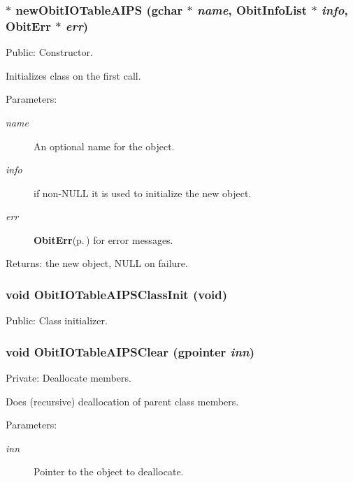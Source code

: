 \subsubsection{$\ast$ new\-Obit\-IOTable\-AIPS (gchar $\ast$ {\em name}, {\bf Obit\-Info\-List} $\ast$ {\em info}, {\bf Obit\-Err} $\ast$ {\em err})}\label{ObitIOTableAIPS_8c_a9}


Public: Constructor. 

Initializes class on the first call. \begin{Desc}
\item[Parameters:]
\begin{description}
\item[{\em name}]An optional name for the object. \item[{\em info}]if non-NULL it is used to initialize the new object. \item[{\em err}]{\bf Obit\-Err}{\rm (p.\,\pageref{structObitErr})} for error messages. \end{description}
\end{Desc}
\begin{Desc}
\item[Returns:]the new object, NULL on failure. \end{Desc}
\subsubsection{\setlength{\rightskip}{0pt plus 5cm}void Obit\-IOTable\-AIPSClass\-Init (void)}\label{ObitIOTableAIPS_8c_a28}


Public: Class initializer. 

\subsubsection{\setlength{\rightskip}{0pt plus 5cm}void Obit\-IOTable\-AIPSClear (gpointer {\em inn})}\label{ObitIOTableAIPS_8c_a5}


Private: Deallocate members. 

Does (recursive) deallocation of parent class members. \begin{Desc}
\item[Parameters:]
\begin{description}
\item[{\em inn}]Pointer to the object to deallocate. \end{description}
\end{Desc}
